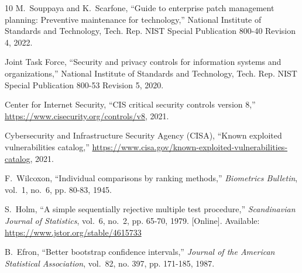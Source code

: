 \documentclass[journal]{IEEEtran}
\begin{document}
\begin{thebibliography}{10}
M.~Souppaya and K.~Scarfone, ``Guide to enterprise patch management planning:
  Preventive maintenance for technology,'' National Institute of Standards and
  Technology, Tech. Rep. {NIST} Special Publication 800-40 Revision 4, 2022.

{Joint Task Force}, ``Security and privacy controls for information systems and
  organizations,'' National Institute of Standards and Technology, Tech. Rep.
  {NIST} Special Publication 800-53 Revision 5, 2020.

{Center for Internet Security}, ``{CIS} critical security controls version 8,''
  \url{https://www.cisecurity.org/controls/v8}, 2021.

{Cybersecurity and Infrastructure Security Agency (CISA)}, ``Known exploited
  vulnerabilities catalog,''
  \url{https://www.cisa.gov/known-exploited-vulnerabilities-catalog}, 2021.

F.~Wilcoxon, ``Individual comparisons by ranking methods,'' \emph{Biometrics
  Bulletin}, vol.~1, no.~6, pp. 80-83, 1945.

\BIBentryALTinterwordspacing
S.~Holm, ``A simple sequentially rejective multiple test procedure,''
  \emph{Scandinavian Journal of Statistics}, vol.~6, no.~2, pp. 65-70, 1979.
  [Online]. Available: \url{https://www.jstor.org/stable/4615733}
\BIBentrySTDinterwordspacing

B.~Efron, ``Better bootstrap confidence intervals,'' \emph{Journal of the
  American Statistical Association}, vol.~82, no. 397, pp. 171-185, 1987.

\end{thebibliography}
\end{document}
